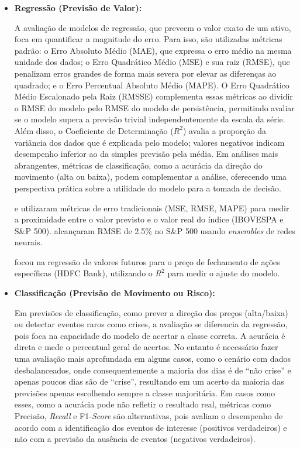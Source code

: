 \begin{itemize}
    \item \textbf{Regressão (Previsão de Valor):}
    
    A avaliação de modelos de regressão, que preveem o valor exato de um ativo, foca em quantificar a magnitude do erro. Para isso, são utilizadas métricas padrão: o Erro Absoluto Médio (MAE), que expressa o erro médio na mesma unidade dos dados; o Erro Quadrático Médio (MSE) e sua raiz (RMSE), que penalizam erros grandes de forma mais severa por elevar as diferenças ao quadrado; e o Erro Percentual Absoluto Médio (MAPE). O Erro Quadrático Médio Escalonado pela Raiz (RMSSE) complementa essas métricas ao dividir o RMSE do modelo pelo RMSE do modelo de persistência, permitindo avaliar se o modelo supera a previsão trivial independentemente da escala da série. Além disso, o Coeficiente de Determinação ($R^2$) avalia a proporção da variância dos dados que é explicada pelo modelo; valores negativos indicam desempenho inferior ao da simples previsão pela média. Em análises mais abrangentes, métricas de classificação, como a acurácia da direção do movimento (alta ou baixa), podem complementar a análise, oferecendo uma perspectiva prática sobre a utilidade do modelo para a tomada de decisão.

     e  utilizaram métricas de erro tradicionais (MSE, RMSE, MAPE) para medir a proximidade entre o valor previsto e o valor real do índice (IBOVESPA e S\&P 500).  alcançaram RMSE de 2.5\% no S\&P 500 usando \textit{ensembles} de redes neurais.

     focou na regressão de valores futuros para o preço de fechamento de ações específicas (HDFC Bank), utilizando o $R^2$ para medir o ajuste do modelo.


    \item \textbf{Classificação (Previsão de Movimento ou Risco):} 

    Em previsões de classificação, como prever a direção dos preços (alta/baixa) ou detectar eventos raros como crises, a avaliação se diferencia da regressão, pois foca na capacidade do modelo de acertar a classe correta. A acurácia é direta e mede o percentual geral de acertos. No entanto é necessário fazer uma avaliação mais aprofundada em alguns casos, como o cenário com dados desbalanceados, onde consequentemente a maioria dos dias é de “não crise” e apenas poucos dias são de “crise”, resultando em um acerto da maioria das previsões apenas escolhendo sempre a classe majoritária. Em casos como esses, como a acurácia pode não refletir o resultado real, métricas como Precisão, \textit{Recall} e F1-\textit{Score} são alternativas, pois avaliam o desempenho de acordo com a identificação dos eventos de interesse (positivos verdadeiros) e não com a previsão da ausência de eventos (negativos verdadeiros).


\end{itemize}
